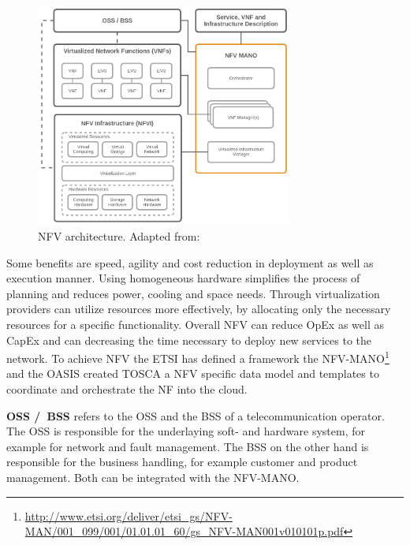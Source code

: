 \begin{figure}[H]
    \centering
    \includegraphics[width=0.75\textwidth]{resources/images/nfv_architecture.png}
    \caption[NFV architecture]{NFV architecture. Adapted from: \cite{NFV:Architecture}}
    \label{fig:nfv_architecture}
\end{figure}

Some benefits are speed, agility and cost reduction in deployment as well as execution manner.\cite[cf.]{Noble:2015}
Using homogeneous hardware simplifies the process of planning and reduces power, cooling and space needs.\cite[cf.]{Noble:2015}
Through virtualization providers can utilize resources more effectively, by allocating only the necessary resources for a specific functionality.\cite[cf.]{Noble:2015}
Overall \ac{NFV} can reduce \ac{OpEx} as well as \ac{CapEx} and can decreasing the time necessary to deploy new services to the network.\cite[cf.]{Noble:2015}
To achieve \ac{NFV} the \ac{ETSI} has defined a framework the \ac{NFV-MANO}\footnote{\url{http://www.etsi.org/deliver/etsi_gs/NFV-MAN/001_099/001/01.01.01_60/gs_NFV-MAN001v010101p.pdf}} and the \ac{OASIS} created \ac{TOSCA} a \ac{NFV} specific data model and templates to coordinate and orchestrate the \ac{NF} into the cloud.

\textbf{\acs{OSS} /\ \acs{BSS}} refers to the \ac{OSS} and the \ac{BSS} of a telecommunication operator.\cite[cf.]{Kahn:2015}
The \ac{OSS} is responsible for the underlaying soft- and hardware system, for example for network and fault management.
The \ac{BSS} on the other hand is responsible for the business handling, for example customer and product management.
Both can be integrated with the \ac{NFV-MANO}.\cite[cf.]{Kahn:2015}

